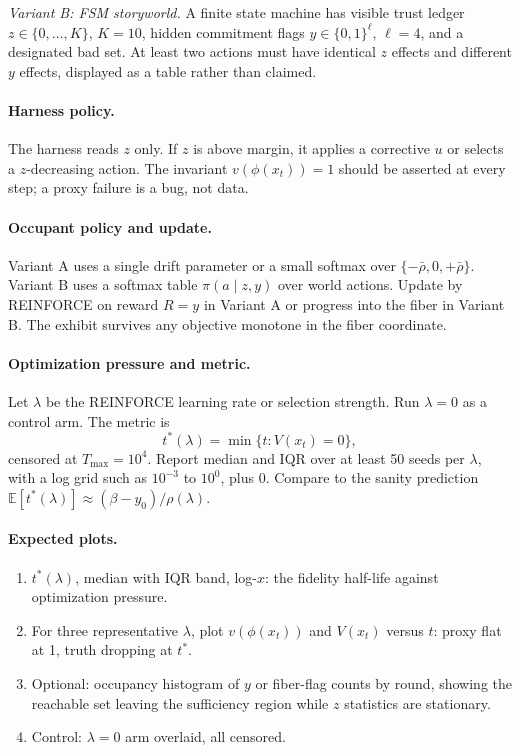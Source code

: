 \documentclass[11pt]{article}
\theoremstyle{definition}
\theoremstyle{remark}
\begin{document}
\emph{Variant B: FSM storyworld.} A finite state machine has visible trust ledger $z\in\{0,\dots,K\}$, $K=10$, hidden commitment flags $y\in\{0,1\}^\ell$, $\ell=4$, and a designated bad set. At least two actions must have identical $z$ effects and different $y$ effects, displayed as a table rather than claimed.

\paragraph{Harness policy.} The harness reads $z$ only. If $z$ is above margin, it applies a corrective $u$ or selects a $z$-decreasing action. The invariant $v(\phi(x_t))=1$ should be asserted at every step; a proxy failure is a bug, not data.

\paragraph{Occupant policy and update.} Variant A uses a single drift parameter or a small softmax over $\{-\bar\rho,0,+\bar\rho\}$. Variant B uses a softmax table $\pi(a\mid z,y)$ over world actions. Update by REINFORCE on reward $R=y$ in Variant A or progress into the fiber in Variant B. The exhibit survives any objective monotone in the fiber coordinate.

\paragraph{Optimization pressure and metric.} Let $\lambda$ be the REINFORCE learning rate or selection strength. Run $\lambda=0$ as a control arm. The metric is
\begin{equation}
t^*(\lambda)=\min\{t:V(x_t)=0\},
\end{equation}
censored at $T_{\max}=10^4$. Report median and IQR over at least 50 seeds per $\lambda$, with a log grid such as $10^{-3}$ to $10^0$, plus $0$. Compare to the sanity prediction $\mathbb E[t^*(\lambda)]\approx(\beta-y_0)/\rho(\lambda)$.

\paragraph{Expected plots.}
\begin{enumerate}
\item $t^*(\lambda)$, median with IQR band, log-$x$: the fidelity half-life against optimization pressure.
\item For three representative $\lambda$, plot $v(\phi(x_t))$ and $V(x_t)$ versus $t$: proxy flat at 1, truth dropping at $t^*$.
\item Optional: occupancy histogram of $y$ or fiber-flag counts by round, showing the reachable set leaving the sufficiency region while $z$ statistics are stationary.
\item Control: $\lambda=0$ arm overlaid, all censored.
\end{enumerate}
\end{document}
